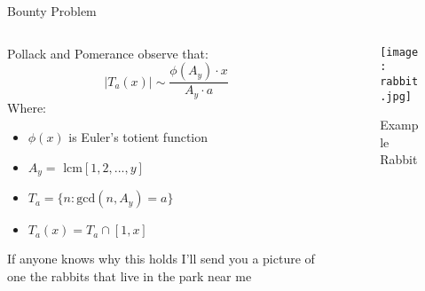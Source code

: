 \documentclass{beamer}
\begin{document}
\begin{frame}{Bounty Problem}
\begin{columns}
\begin{column}{0.5\textwidth}{\small
  Pollack and Pomerance observe that:
   $$|T_a(x)|  \sim  \frac{\phi(A_y) \cdot x}{ A_y \cdot a}$$
    Where:
    \begin{itemize}
    \item $\phi(x)$ is Euler's totient function 
    \item $A_y = \text{ lcm}[1, 2, ..., y]$
    \item $T_a = \{n : \text{gcd}(n, A_y) = a\}$
    \item $T_a(x) = T_a \cap [1,x]$
\end{itemize}
If anyone knows why this holds I'll send you a picture of one the rabbits that live in the park near me}
\end{column}
\begin{column}{0.5\textwidth}  %
\begin{center}
    \begin{figure}
    
    \texttt{[image: rabbit.jpg]}
    \caption{Example Rabbit}
    \label{fig:my_label}
\end{figure}
\end{center}    
\end{column}
\end{columns}
\end{frame}
\end{document}
